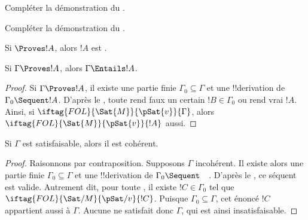 \documentclass[11pt,a4paper,openany]{memoir}
\begin{document}
\begin{prob}
Compléter la démonstration du .
\end{prob}
\tagendprob

\begin{prob}
Compléter la démonstration du .
\end{prob}
\tagendprob

\begin{cor}
Si $\Proves !A$, alors $!A$ est .
\end{cor}

\begin{cor}
Si $\Gamma \Proves !A$, alors $\Gamma \Entails !A$.
\end{cor}

\begin{proof}
Si $\Gamma \Proves !A$, il existe une partie finie
$\Gamma_0 \subseteq \Gamma$ et une !!{derivation} de
$\Gamma_0 \Sequent !A$. D'après le ,
toute 
rend faux un certain $!B \in \Gamma_0$ ou rend vrai $!A$.
Ainsi, si $\iftag{FOL}{\Sat{M}}{\pSat{v}}{\Gamma}$, alors
$\iftag{FOL}{\Sat{M}}{\pSat{v}}{!A}$ aussi.
\end{proof}

\begin{cor}
Si $\Gamma$ est satisfaisable, alors il est cohérent.
\end{cor}

\begin{proof}
Raisonnons par contraposition. Supposons $\Gamma$ incohérent.
Il existe alors une partie finie $\Gamma_0 \subseteq \Gamma$
et une !!{derivation} de $\Gamma_0 \Sequent \quad$.
D'après le , ce séquent est valide.
Autrement dit, pour toute
,
il existe $!C \in \Gamma_0$ tel que
$\iftag{FOL}{\Sat/{M}}{\pSat/{v}}{!C}$.
Puisque $\Gamma_0 \subseteq \Gamma$, cet énoncé $!C$ appartient
aussi à $\Gamma$. Aucune 
ne satisfait donc $\Gamma$, qui est ainsi insatisfaisable.
\end{proof}


\endgroup
\end{document}
